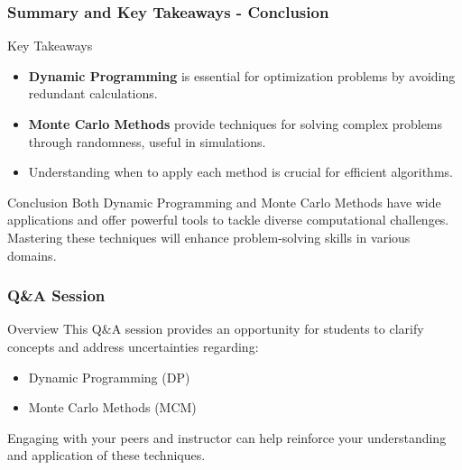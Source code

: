 \documentclass[aspectratio=169]{beamer}
\begin{document}
\begin{frame}[fragile]
    \frametitle{Summary and Key Takeaways - Conclusion}
    
    \begin{block}{Key Takeaways}
        \begin{itemize}
            \item \textbf{Dynamic Programming} is essential for optimization problems by avoiding redundant calculations.
            \item \textbf{Monte Carlo Methods} provide techniques for solving complex problems through randomness, useful in simulations.
            \item Understanding when to apply each method is crucial for efficient algorithms.
        \end{itemize}
    \end{block}
    
    \begin{block}{Conclusion}
        Both Dynamic Programming and Monte Carlo Methods have wide applications and offer powerful tools to tackle diverse computational challenges. Mastering these techniques will enhance problem-solving skills in various domains.
    \end{block}
\end{frame}

\begin{frame}[fragile]
    \frametitle{Q\&A Session}
    \begin{block}{Overview}
        This Q\&A session provides an opportunity for students to clarify concepts and address uncertainties regarding:
        \begin{itemize}
            \item Dynamic Programming (DP)
            \item Monte Carlo Methods (MCM)
        \end{itemize}
        Engaging with your peers and instructor can help reinforce your understanding and application of these techniques.
    \end{block}
\end{frame}
\end{document}
